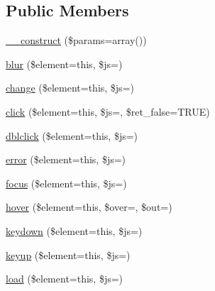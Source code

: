 \subsection*{Public Members}
\begin{DoxyCompactItemize}
\item 
\mbox{\hyperlink{class_c_i___javascript_a568ecdb0d73d2a870f33189739922a50}{\+\_\+\+\_\+construct}} (\$params=array())
\item 
\mbox{\hyperlink{class_c_i___javascript_a3aacb753ebd61030bad68fb877e52699}{blur}} (\$element=\textquotesingle{}this\textquotesingle{}, \$js=\textquotesingle{}\textquotesingle{})
\item 
\mbox{\hyperlink{class_c_i___javascript_a65a4442663cf513c7f18abfc6f0955aa}{change}} (\$element=\textquotesingle{}this\textquotesingle{}, \$js=\textquotesingle{}\textquotesingle{})
\item 
\mbox{\hyperlink{class_c_i___javascript_a508491310edc8bcb766f0adc89ec24c4}{click}} (\$element=\textquotesingle{}this\textquotesingle{}, \$js=\textquotesingle{}\textquotesingle{}, \$ret\+\_\+false=T\+R\+UE)
\item 
\mbox{\hyperlink{class_c_i___javascript_a9f2699300751803206016d510d448ea0}{dblclick}} (\$element=\textquotesingle{}this\textquotesingle{}, \$js=\textquotesingle{}\textquotesingle{})
\item 
\mbox{\hyperlink{class_c_i___javascript_ac6c4977af5ec27a5addbb3b2a28912e2}{error}} (\$element=\textquotesingle{}this\textquotesingle{}, \$js=\textquotesingle{}\textquotesingle{})
\item 
\mbox{\hyperlink{class_c_i___javascript_aa00a3db94f50b79b948d90a48e4bc286}{focus}} (\$element=\textquotesingle{}this\textquotesingle{}, \$js=\textquotesingle{}\textquotesingle{})
\item 
\mbox{\hyperlink{class_c_i___javascript_a6f8cfdbca8f6b2c2d68bb9a38a8f96a7}{hover}} (\$element=\textquotesingle{}this\textquotesingle{}, \$over=\textquotesingle{}\textquotesingle{}, \$out=\textquotesingle{}\textquotesingle{})
\item 
\mbox{\hyperlink{class_c_i___javascript_ad707956fd5a0588de445d786396b33ec}{keydown}} (\$element=\textquotesingle{}this\textquotesingle{}, \$js=\textquotesingle{}\textquotesingle{})
\item 
\mbox{\hyperlink{class_c_i___javascript_a8c6e3a3b521c059cfd6799b3dc73d0d6}{keyup}} (\$element=\textquotesingle{}this\textquotesingle{}, \$js=\textquotesingle{}\textquotesingle{})
\item 
\mbox{\hyperlink{class_c_i___javascript_a5e0d3ce786a91561730aa9610b811f67}{load}} (\$element=\textquotesingle{}this\textquotesingle{}, \$js=\textquotesingle{}\textquotesingle{})

\end{DoxyCompactItemize}
